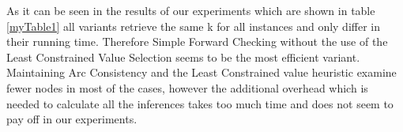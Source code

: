 \documentclass[a4paper]{scrartcl}
\begin{document}
As it can be seen in the results of our experiments which are shown in table \ref{myTable1} all variants retrieve the same k for all instances and only differ in their running time. Therefore Simple Forward Checking without the use of the Least Constrained Value Selection seems to be the most efficient variant. Maintaining Arc Consistency and the Least Constrained value heuristic examine fewer nodes in most of the cases, however the additional overhead which is needed to calculate all the inferences takes too much time and does not seem to pay off in our experiments.






\end{document}
